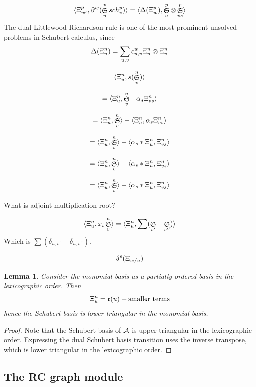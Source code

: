 \documentclass{elsarticle}
\newtheorem{lemma}{Lemma}[section]
\theoremstyle{definition}
\theoremstyle{remark}
\numberwithin{equation}{subsection}
\DeclareMathOperator{\sch}{\mathfrak{S}}
\newcommand{\code}{\mathfrak{c}}
\begin{document}
	$$\langle \dsch_{w'}^p,\partial^w(\sch_u^p sch_v^p)\rangle = \langle \Delta(\dsch_w^p),\sch_u^p\otimes\sch_{vs}^p\rangle$$
	The dual Littlewood-Richardson rule is one of the most prominent unsolved problems in Schubert calculus, since
	$$\Delta(\Xi_u^n) = \sum_{u,v} c_{u,v}^w\Xi_u^n\otimes \Xi_v^n$$
	
	$$\langle \dsch_u^n,s(\sch_v^n)\rangle$$
	
	$$=\langle \dsch_u^n,\sch_v^n-\alpha_s\dsch_{vs}^n\rangle$$
	
	$$=\langle \dsch_u^n,\sch_v^n\rangle-\langle\dsch_u^n,\alpha_s\dsch_{vs}^n\rangle$$
	
	$$=\langle \dsch_u^n,\sch_v^n\rangle-\langle\alpha_s*\dsch_u^n,\dsch_{vs}^n\rangle$$
	
	$$=\langle \dsch_u^n,\sch_v^n\rangle-\langle\alpha_s*\dsch_u^n,\dsch_{vs}^n\rangle$$
	
	$$=\langle \dsch_u^n,\sch_v^n\rangle-\langle\alpha_s*\dsch_u^n,\dsch_{vs}^n\rangle$$
	
	What is adjoint multiplication root?
	
	$$\langle \dsch_u^n,x_i\sch_v^n\rangle = \langle \dsch_u^n,\sum(\sch_{v'}-\sch_{v''})\rangle$$
	Which is $\sum(\delta_{u,v'}-\delta_{u,v''})$.
	
	$$\delta^s(\Xi_{w/u})$$
	
	
		
		\begin{lemma} \label{lemma:triangular}
			Consider the monomial basis as a partially ordered basis in the lexicographic order. Then
			$$\dsch_u^n = \code(u) + \mbox{smaller terms}$$
			hence the Schubert basis is lower triangular in the monomial basis.
		\end{lemma}
		\begin{proof}
			Note that the Schubert basis of $\mathcal{A}$ is upper triangular in the lexicographic order. Expressing the dual Schubert basis transition uses the inverse transpose, which is lower triangular in the lexicographic order.
		\end{proof}


\subsection{The RC graph module}
\end{document}
